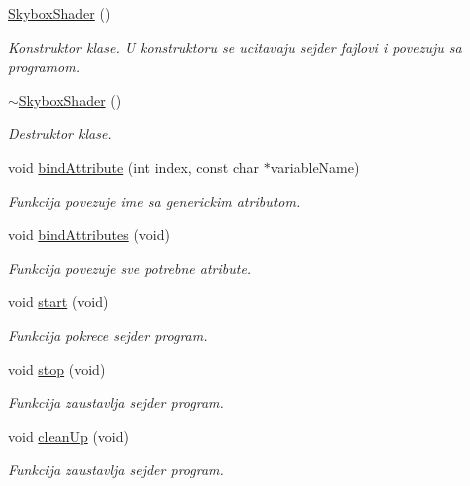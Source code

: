 \begin{DoxyCompactItemize}
\item 
\hyperlink{classshader_1_1SkyboxShader_a88e79167a010f126f34b7948187a2fb0}{Skybox\+Shader} ()
\begin{DoxyCompactList}\small\item\em Konstruktor klase. U konstruktoru se ucitavaju sejder fajlovi i povezuju sa programom. \end{DoxyCompactList}\item 
\hyperlink{classshader_1_1SkyboxShader_a95a5bab5ba781c47c594621f4f0059f4}{$\sim$\+Skybox\+Shader} ()
\begin{DoxyCompactList}\small\item\em Destruktor klase. \end{DoxyCompactList}\item 
void \hyperlink{classshader_1_1SkyboxShader_ab97f006a672c72d1821f16e20f50307e}{bind\+Attribute} (int index, const char $\ast$variable\+Name)
\begin{DoxyCompactList}\small\item\em Funkcija povezuje ime sa generickim atributom. \end{DoxyCompactList}\item 
void \hyperlink{classshader_1_1SkyboxShader_a82e42bdf622da1879f391ea65749f1e7}{bind\+Attributes} (void)
\begin{DoxyCompactList}\small\item\em Funkcija povezuje sve potrebne atribute. \end{DoxyCompactList}\item 
void \hyperlink{classshader_1_1SkyboxShader_aafcfd5c65e11b80953a8ba9645b0e2bf}{start} (void)
\begin{DoxyCompactList}\small\item\em Funkcija pokrece sejder program. \end{DoxyCompactList}\item 
void \hyperlink{classshader_1_1SkyboxShader_a81d50b999a376fcd9cbbc20faa79df60}{stop} (void)
\begin{DoxyCompactList}\small\item\em Funkcija zaustavlja sejder program. \end{DoxyCompactList}\item 
void \hyperlink{classshader_1_1SkyboxShader_a23be1cc008c7ac985cd34be65c446238}{clean\+Up} (void)
\begin{DoxyCompactList}\small\item\em Funkcija zaustavlja sejder program. \end{DoxyCompactList}\item 

\end{DoxyCompactItemize}
